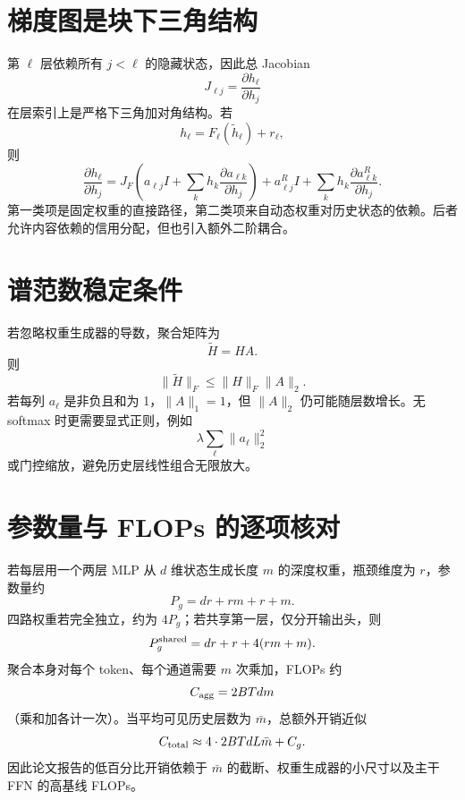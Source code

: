 \documentclass[UTF8,12pt,a4paper,fontset=none]{ctexart}
\numberwithin{equation}{section}
\begin{document}
\section{梯度图是块下三角结构}
第 $\ell$ 层依赖所有 $j<\ell$ 的隐藏状态，因此总 Jacobian
\begin{equation}
 J_{\ell j}=\frac{\partial h_\ell}{\partial h_j}
\end{equation}
在层索引上是严格下三角加对角结构。若
\begin{equation}
 h_\ell=F_\ell(\widetilde h_\ell)+r_\ell,
\end{equation}
则
\begin{equation}
 \frac{\partial h_\ell}{\partial h_j}
 =J_F\left(a_{\ell j}I+
 \sum_k h_k\frac{\partial a_{\ell k}}{\partial h_j}\right)
 +a^R_{\ell j}I+
 \sum_k h_k\frac{\partial a^R_{\ell k}}{\partial h_j}.
\end{equation}
第一类项是固定权重的直接路径，第二类项来自动态权重对历史状态的依赖。后者允许内容依赖的信用分配，但也引入额外二阶耦合。

\section{谱范数稳定条件}
若忽略权重生成器的导数，聚合矩阵为
\begin{equation}
 \widetilde H=HA.
\end{equation}
则
\begin{equation}
 \|\widetilde H\|_F\le\|H\|_F\|A\|_2.
\end{equation}
若每列 $a_\ell$ 是非负且和为 1，$\|A\|_1=1$，但 $\|A\|_2$ 仍可能随层数增长。无 softmax 时更需要显式正则，例如
\begin{equation}
 \lambda\sum_\ell\|a_\ell\|_2^2
\end{equation}
或门控缩放，避免历史层线性组合无限放大。

\section{参数量与 FLOPs 的逐项核对}
若每层用一个两层 MLP 从 $d$ 维状态生成长度 $m$ 的深度权重，瓶颈维度为 $r$，参数量约
\begin{equation}
 P_g=dr+rm+r+m.
\end{equation}
四路权重若完全独立，约为 $4P_g$；若共享第一层，仅分开输出头，则
\begin{equation}
 P_g^{\rm shared}=dr+r+4(rm+m).
\end{equation}
聚合本身对每个 token、每个通道需要 $m$ 次乘加，FLOPs 约
\begin{equation}
 C_{\rm agg}=2BTdm
\end{equation}
（乘和加各计一次）。当平均可见历史层数为 $\bar m$，总额外开销近似
\begin{equation}
 C_{\rm total}\approx 4\cdot2BTdL\bar m+C_g.
\end{equation}
因此论文报告的低百分比开销依赖于 $\bar m$ 的截断、权重生成器的小尺寸以及主干 FFN 的高基线 FLOPs。
\end{document}
